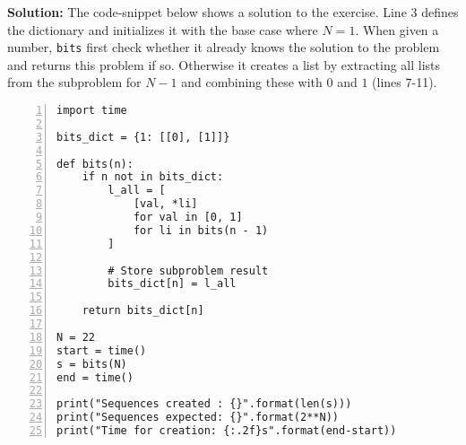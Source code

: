 \documentclass[12pt]{report}
\begin{document}
\textbf{Solution:}
The code-snippet below shows a solution to the exercise. Line 3 defines the dictionary and initializes it with the base case where $N=1$. When given a number, \texttt{bits} first check whether it already knows the solution to the problem and returns this problem if so. Otherwise it creates a list by extracting all lists from the subproblem for $N-1$ and combining these with $0$ and $1$ (lines 7-11). 

\begin{framed}
\begin{lstlisting}[style=Python, numbers=left]
import time

bits_dict = {1: [[0], [1]]}

def bits(n):
    if n not in bits_dict:
        l_all = [
            [val, *li]
            for val in [0, 1]
            for li in bits(n - 1)
        ]

        # Store subproblem result
        bits_dict[n] = l_all

    return bits_dict[n]

N = 22
start = time()
s = bits(N)
end = time()

print("Sequences created : {}".format(len(s)))
print("Sequences expected: {}".format(2**N))
print("Time for creation: {:.2f}s".format(end-start))

\end{lstlisting}
\end{framed}
\end{document}
